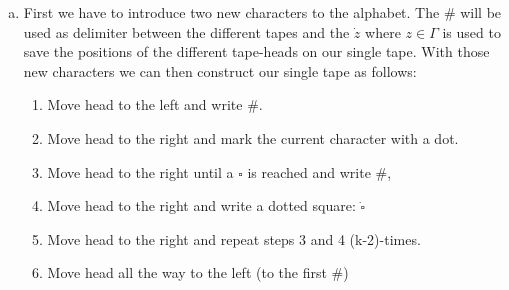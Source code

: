 \documentclass{article} %
\begin{document}
\begin{enumerate}[(a)]
\item
First we have to introduce two new characters to the alphabet. The $\#$ will be used as delimiter between the different tapes and the $\dot{z}$ where $z \in \Gamma$ is used to save the positions of the different tape-heads on our single tape. With those new characters we can then construct our single tape as follows:
\begin{enumerate}[1.]
\item Move head to the left and write $\#$.
\item Move head to the right and mark the current character with a dot.
\item Move head to the right until a $\square$ is reached and write $\#$,
\item Move head to the right and write a dotted square: $\dot{\square}$
\item Move head to the right and repeat steps 3 and 4 (k-2)-times.
\item Move head all the way to the left (to the first $\#$)
\end{enumerate}


\end{enumerate}
\end{document}
